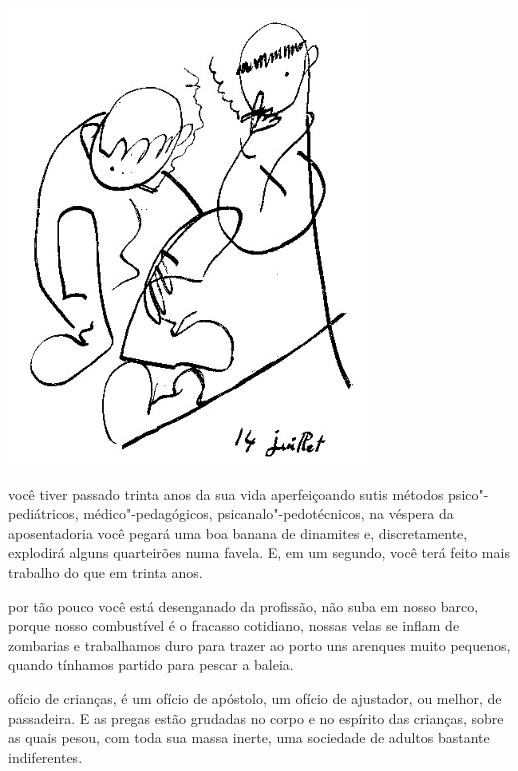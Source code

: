 \begin{vplace}[.50]
\begin{center}
\includegraphics[width=95mm]{./imgs/Image_13.jpg}
\end{center}
\end{vplace}

\pagebreak
\thispagestyle{empty}


\movetooddpage


 você tiver passado trinta anos da sua vida aperfeiçoando sutis
métodos psico"-pediátricos, médico"-pedagógicos, psicanalo"-pedotécnicos,
na véspera da aposentadoria você pegará uma boa banana de dinamites e,
discretamente, explodirá alguns quarteirões numa favela. E, em um segundo,
você terá feito mais trabalho do que em trinta anos.

\bigskip
\bigskip

 por tão pouco você está desenganado da profissão, não suba em nosso
barco, porque nosso combustível é o fracasso cotidiano, nossas velas se
inflam de zombarias e trabalhamos duro para trazer ao porto uns arenques
muito pequenos, quando tínhamos partido para pescar a baleia.

\bigskip
\bigskip

 ofício de crianças, é um ofício de apóstolo, um ofício de
ajustador, ou melhor, de passadeira. E as pregas estão grudadas no corpo
e no espírito das crianças, sobre as quais pesou, com toda sua massa
inerte, uma sociedade de adultos bastante indiferentes.

\pagebreak
\thispagestyle{empty}